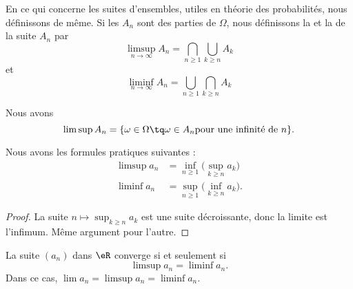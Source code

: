 \begin{normaltext}      \label{ooEEQJooRMFzVR}
    En ce qui concerne les suites d'ensembles, utiles en théorie des probabilités, nous définissons de même. Si les \( A_n\) sont des parties de \( \Omega\), nous définissons la  et la  de la suite \( A_n\) par
\begin{equation}
    \limsup_{n\to\infty}A_n=\bigcap_{n\geq 1}\bigcup_{k\geq n}A_k
\end{equation}
et
\begin{equation}
    \liminf_{n\to\infty}A_n=\bigcup_{n\geq 1}\bigcap_{k\geq n}A_k
\end{equation}

Nous avons
\begin{equation}
    \limsup A_n=\{ \omega\in\Omega\tq \omega\in A_n\text{pour une infinité de } n \}.
\end{equation}
\end{normaltext}

\begin{lemma}     \label{ooAQTEooYDBovS}
    Nous avons les formules pratiques suivantes :
    \begin{subequations}
        \begin{align}
            \limsup a_n&=\inf_{n\geq 1}\big( \sup_{k\geq n}a_k \big)\\
            \liminf a_n&=\sup_{n\geq 1}\big( \inf_{k\geq n}a_k \big).
        \end{align}
    \end{subequations}
\end{lemma}

\begin{proof}
    La suite \( n\mapsto \sup_{k\geq n}a_k\) est une suite décroissante, donc la limite est l'infimum. Même argument pour l'autre.
\end{proof}

\begin{lemma}       \label{ooIQIKooXWwAmM}
    La suite \( (a_n)\) dans \( \eR\) converge si et seulement si
    \begin{equation}
        \limsup a_n=\liminf a_n.
    \end{equation}
    Dans ce cas, \( \lim a_n=\limsup a_n=\liminf a_n\).
\end{lemma}

